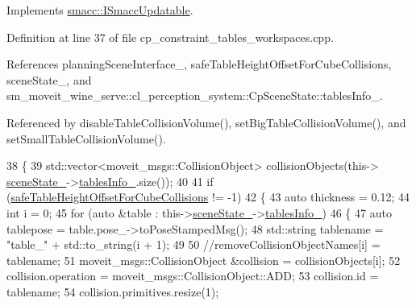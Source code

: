 Implements \hyperlink{classsmacc_1_1ISmaccUpdatable_a84ee0520cbefdb1d412bed54650b028e}{smacc\+::\+I\+Smacc\+Updatable}.



Definition at line 37 of file cp\+\_\+constraint\+\_\+tables\+\_\+workspaces.\+cpp.



References planning\+Scene\+Interface\+\_\+, safe\+Table\+Height\+Offset\+For\+Cube\+Collisions, scene\+State\+\_\+, and sm\+\_\+moveit\+\_\+wine\+\_\+serve\+::cl\+\_\+perception\+\_\+system\+::\+Cp\+Scene\+State\+::tables\+Info\+\_\+.



Referenced by disable\+Table\+Collision\+Volume(), set\+Big\+Table\+Collision\+Volume(), and set\+Small\+Table\+Collision\+Volume().


\begin{DoxyCode}
38         \{
39             std::vector<moveit\_msgs::CollisionObject> collisionObjects(this->
      \hyperlink{classsm__moveit__wine__serve_1_1cl__move__group__interface_1_1CpConstraintTableWorkspaces_aab7d48a69283768e66236eaf39c52554}{sceneState\_}->\hyperlink{classsm__moveit__wine__serve_1_1cl__perception__system_1_1CpSceneState_aa6aea93bb143d2def50c97ec6b55e4cf}{tablesInfo\_}.size());
40 
41             \textcolor{keywordflow}{if} (\hyperlink{classsm__moveit__wine__serve_1_1cl__move__group__interface_1_1CpConstraintTableWorkspaces_a5233fcac3ab6ce00f9e1c6e950462e58}{safeTableHeightOffsetForCubeCollisions} != -1)
42             \{
43                 \textcolor{keyword}{auto} thickness = 0.12;
44                 \textcolor{keywordtype}{int} i = 0;
45                 \textcolor{keywordflow}{for} (\textcolor{keyword}{auto} &table : this->\hyperlink{classsm__moveit__wine__serve_1_1cl__move__group__interface_1_1CpConstraintTableWorkspaces_aab7d48a69283768e66236eaf39c52554}{sceneState\_}->\hyperlink{classsm__moveit__wine__serve_1_1cl__perception__system_1_1CpSceneState_aa6aea93bb143d2def50c97ec6b55e4cf}{tablesInfo\_})
46                 \{
47                     \textcolor{keyword}{auto} tablepose = table.pose\_->toPoseStampedMsg();
48                     std::string tablename = \textcolor{stringliteral}{"table\_"} + std::to\_string(i + 1);
49 
50                     \textcolor{comment}{//removeCollisionObjectNames[i] = tablename;}
51                     moveit\_msgs::CollisionObject &collision = collisionObjects[i];
52                     collision.operation = moveit\_msgs::CollisionObject::ADD;
53                     collision.id = tablename;
54                     collision.primitives.resize(1);

\end{DoxyCode}
